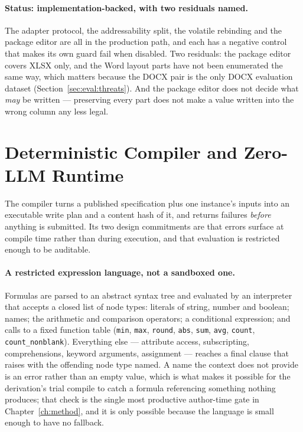 \paragraph{Status: implementation-backed, with two residuals named.}
The adapter protocol, the addressability split, the volatile rebinding and the package editor
are all in the production path, and each has a negative control that makes its own guard fail
when disabled. Two residuals: the package editor covers XLSX only, and the Word layout parts
have not been enumerated the same way, which matters because the DOCX pair is the only DOCX
evaluation dataset (Section~\ref{sec:eval:threats}). And the package editor does not decide
what \emph{may} be written --- preserving every part does not make a value written into the
wrong column any less legal.

\section{Deterministic Compiler and Zero-LLM Runtime}
\label{sec:design:runtime}

The compiler turns a published specification plus one instance's inputs into an executable
write plan and a content hash of it, and returns failures \emph{before} anything is submitted.
Its two design commitments are that errors surface at compile time rather than during
execution, and that evaluation is restricted enough to be auditable.

\paragraph{A restricted expression language, not a sandboxed one.}
Formulas are parsed to an abstract syntax tree and evaluated by an interpreter that accepts a
closed list of node types: literals of string, number and boolean; names; the arithmetic and
comparison operators; a conditional expression; and calls to a fixed function table
(\texttt{min}, \texttt{max}, \texttt{round}, \texttt{abs}, \texttt{sum}, \texttt{avg},
\texttt{count}, \texttt{count\_nonblank}). Everything else --- attribute access, subscripting,
comprehensions, keyword arguments, assignment --- reaches a final clause that raises with the
offending node type named. A name the context does not provide is an error rather than an
empty value, which is what makes it possible for the derivation's trial compile to catch a
formula referencing something nothing produces; that check is the single most productive
author-time gate in Chapter~\ref{ch:method}, and it is only possible because the language is
small enough to have no fallback.

